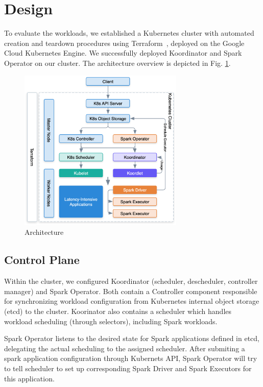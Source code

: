 
\section{Design}

To evaluate the workloads, we established a Kubernetes cluster with automated creation and teardown procedures using Terraform~\cite{terraform}, deployed on the Google Cloud Kubernetes Engine. We successfully deployed Koordinator \cite{koo} and Spark Operator on our cluster. The architecture overview is depicted in Fig. \ref{fig:arch}.

\begin{figure}[h]
    \centering
    \includegraphics[width=0.7\textwidth]{img-arch.png}
    \caption{Architecture}
    \label{fig:arch}
\end{figure}

\subsection{Control Plane}

Within the cluster, we configured Koordinator (scheduler, descheduler, controller manager) and Spark Operator. Both contain a Controller \cite{kcontroller} component responsible for synchronizing workload configuration from Kubernetes internal object storage (etcd) to the cluster. Koorinator also contains a scheduler which handles workload scheduling (through selectors), including Spark workloads.

Spark Operator listens to the desired state for Spark applications defined in etcd, delegating the actual scheduling to the assigned scheduler. After submiting a spark application configuration through Kubernets API, Spark Operator will try to tell scheduler to set up corresponding Spark Driver and Spark Executors for this application.


